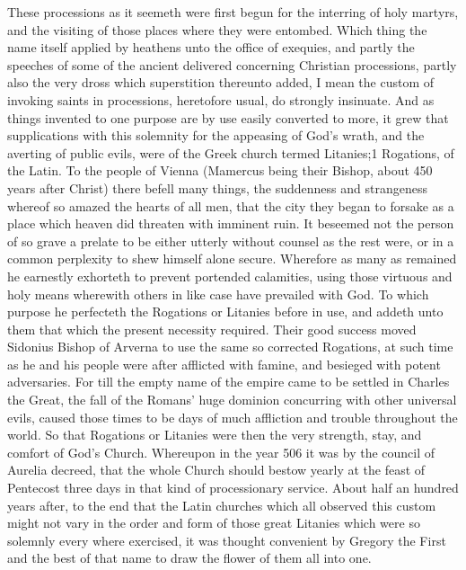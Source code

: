 These processions as it seemeth were first begun for the interring of holy martyrs, and the visiting of those places where they were entombed. Which thing the name itself applied by heathens unto the office of exequies, and partly the speeches of some of the ancient delivered concerning Christian processions, partly also the very dross which superstition thereunto added, I mean the custom of invoking saints in processions, heretofore usual, do strongly insinuate. And as things invented to one purpose are by use easily converted to more, it grew that supplications with this solemnity  for the appeasing of God’s wrath, and the averting of public evils, were of the Greek church termed Litanies;1 Rogations, of the Latin. To the people of Vienna (Mamercus being their Bishop, about 450 years after Christ) there befell many things, the suddenness and strangeness whereof so amazed the hearts of all men, that the city they began to forsake as a place which heaven did threaten with imminent ruin. It beseemed not the person of so grave a prelate to be either utterly without counsel as the rest were, or in a common perplexity to shew himself alone secure. Wherefore as many as remained he earnestly exhorteth to prevent portended calamities, using those virtuous and holy means wherewith others in like case have prevailed with God. To which purpose he perfecteth the Rogations or Litanies before in use, and addeth unto them that which the present necessity required. Their good success moved Sidonius Bishop of Arverna to use the same so corrected Rogations, at such time as he and his people were  after afflicted with famine, and besieged with potent adversaries. For till the empty name of the empire came to be settled in Charles the Great, the fall of the Romans’ huge dominion concurring with other universal evils, caused those times to be days of much affliction and trouble throughout the world. So that Rogations or Litanies were then the very strength, stay, and comfort of God’s Church. Whereupon in the year 506 it was by the council of Aurelia decreed, that the whole Church should bestow yearly at the feast of Pentecost three days in that kind of processionary service. About half an hundred years after, to the end that the Latin churches which all observed this custom might not vary in the order and form of those great Litanies which were so solemnly every where exercised, it was thought convenient by Gregory the First and the best of that name to draw the flower of them all into one.
